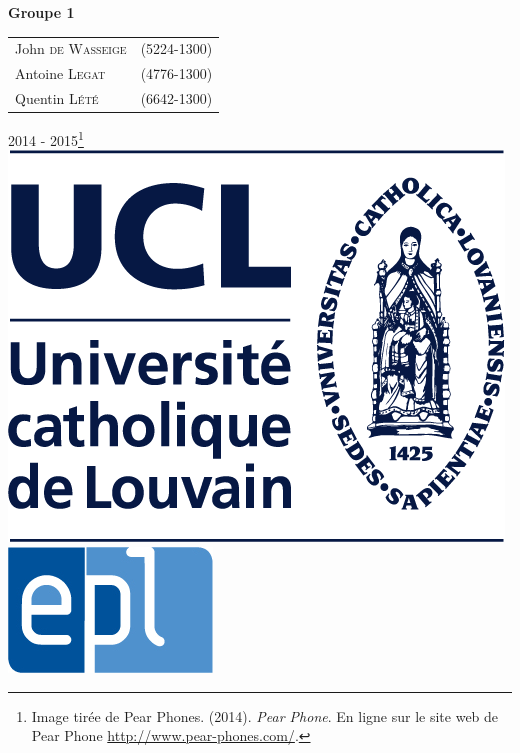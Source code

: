 \begin{titlepage}
	{ \Large
	\begin{center}
	\textbf{Groupe 1}
	\end{center}
	}
	
		
	\vspace{0.2cm}	
	
      \begin{tabular}{lc}
     John \textsc{de Wasseige} & (5224-1300) \\
	Antoine \textsc{Legat} & (4776-1300) \\
	Quentin \textsc{Lété} & (6642-1300) \\
      \end{tabular}
      
      \vfill
      





\vfill
{\normalsize 2014 - 2015\footnote{Image tirée de Pear Phones. (2014). \textit{Pear Phone}. En ligne sur le site web de Pear Phone \url{http://www.pear-phones.com/}.}}\\

  \includegraphics[height = 0.07\textheight]{img/ucl.png} \hfill
  \includegraphics[height = 0.07\textheight]{img/epl.jpg}

\end{titlepage}